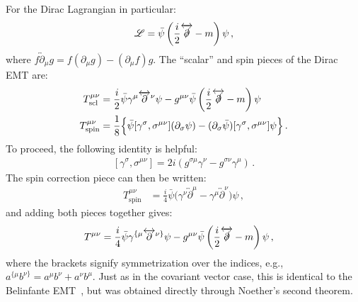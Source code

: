 \documentclass[prd,preprint,
  showpacs,showkeys,lengthcheck,
  nofootinbib,tightenlines,onecolumn,notitlepage,
  preprintnumbers,superscriptaddress]{revtex4-1}
\newcommand{\Lag}{\ensuremath{\mathscr{L}}}
\begin{document}
For the Dirac Lagrangian in particular:
\begin{align}
  \Lag
  =
  \bar\psi
  \left( \frac{i}{2}\overleftrightarrow{\slashed{\partial}} - m \right)
  \psi
  \,,
\end{align}
where
$f \overleftrightarrow{\partial}_\mu g = f (\partial_\mu g) - (\partial_\mu f) g$.
The ``scalar'' and spin pieces of the
Dirac EMT are:
\begin{subequations}
  \begin{align}
    T^{\mu\nu}_{\mathrm{scl}}
    &=
    \frac{i}{2} \bar\psi \gamma^\mu \overleftrightarrow{\partial}^\nu \psi
    -
    g^{\mu\nu}
    \bar\psi
    \left( \frac{i}{2}\overleftrightarrow{\slashed{\partial}} - m \right)
    \psi
    \\
    T^{\mu\nu}_{\mathrm{spin}}
    &=
    \frac{1}{8}
    \Big\{
      \bar\psi
      [\gamma^\sigma, \sigma^{\mu\nu}]
      (\partial_\sigma\psi)
      -
      (\partial_\sigma\bar\psi)
      [\gamma^\sigma, \sigma^{\mu\nu}]
      \psi
      \Big\}
    \,.
  \end{align}
\end{subequations}
To proceed, the following identity is helpful:
\begin{align}
  \label{eqn:id:gs}
  [\gamma^\sigma, \sigma^{\mu\nu}]
  =
  2i( g^{\sigma\mu} \gamma^\nu - g^{\sigma\nu} \gamma^\mu )
  \,.
\end{align}
The spin correction piece can then be written:
\begin{align}
  T^{\mu\nu}_{\mathrm{spin}}
  &=
  \frac{i}{4}
  \bar\psi
  \Big(
  \gamma^\nu \overleftrightarrow{\partial}^\mu
  -
  \gamma^\mu \overleftrightarrow{\partial}^\nu
  \Big)
  \psi
  \,,
\end{align}
and adding both pieces together gives:
\begin{align}
  \label{eqn:emt:dirac}
  T^{\mu\nu}
  &=
  \frac{i}{4} \bar\psi \gamma^{\{\mu} \overleftrightarrow{\partial}^{\nu\}} \psi
  -
  g^{\mu\nu}
  \bar\psi
  \left( \frac{i}{2}\overleftrightarrow{\slashed{\partial}} - m \right)
  \psi
  \,,
\end{align}
where the brackets signify symmetrization over the indices,
e.g., $a^{\{\mu}b^{\nu\}} = a^\mu b^\nu + a^\nu b^\mu$.
Just as in the covariant vector case,
this is identical to the Belinfante EMT~\cite{Belinfante:1939emt},
but was obtained directly through Noether's second theorem.

\end{document}
